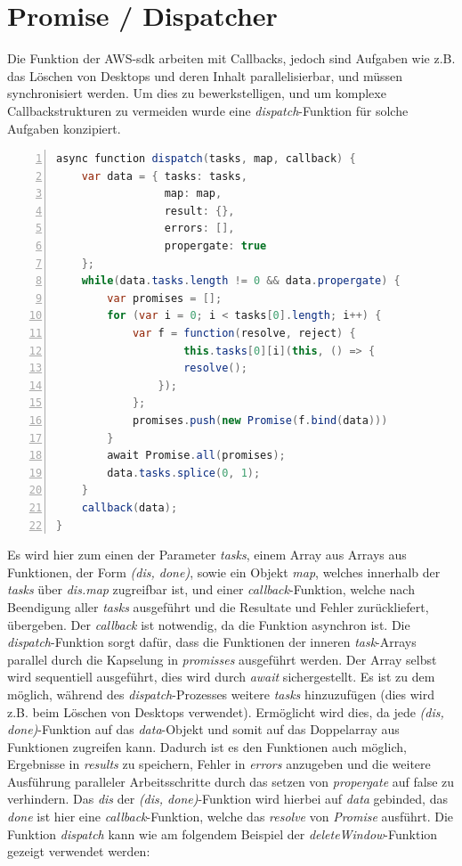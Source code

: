 \documentclass[a4paper, 12pt]{scrreprt}
\renewcommand\_{\textunderscore\allowbreak}
\begin{document}
\section{Promise / Dispatcher}

Die Funktion der AWS-sdk arbeiten mit Callbacks, jedoch sind Aufgaben wie z.B. das Löschen von Desktops und deren Inhalt parallelisierbar, und müssen synchronisiert werden. Um dies zu bewerkstelligen, und um komplexe Callbackstrukturen zu vermeiden wurde eine \textit{dispatch}-Funktion für solche Aufgaben konzipiert. 

\begin{lstlisting}[xleftmargin=\parindent,numbers=left,numberstyle=\small,numbersep=8pt,frame=L,mathescape=true, basicstyle=\small, language=Java, lineskip={1.0pt}]
async function dispatch(tasks, map, callback) {
    var data = { tasks: tasks,
                 map: map, 
                 result: {}, 
                 errors: [], 
                 propergate: true 
    };
    while(data.tasks.length != 0 && data.propergate) {
        var promises = [];
        for (var i = 0; i < tasks[0].length; i++) {
            var f = function(resolve, reject) {
                    this.tasks[0][i](this, () => {
                    resolve();
                });
            };
            promises.push(new Promise(f.bind(data)))
        }
        await Promise.all(promises);
        data.tasks.splice(0, 1);
    }
    callback(data);
}
\end{lstlisting}

Es wird hier zum einen der Parameter \textit{tasks}, einem Array aus Arrays aus Funktionen, der Form \textit{(dis, done)}, sowie ein Objekt \textit{map}, welches innerhalb der \textit{tasks} über \textit{dis.map} zugreifbar ist, und einer \textit{callback}-Funktion, welche nach Beendigung aller \textit{tasks} ausgeführt und die Resultate und Fehler zurückliefert, übergeben. Der \textit{callback} ist notwendig, da die Funktion asynchron ist. Die \textit{dispatch}-Funktion sorgt dafür, dass die Funktionen der inneren \textit{task}-Arrays parallel durch die Kapselung in \textit{promisses} ausgeführt werden. Der Array selbst wird sequentiell ausgeführt, dies wird durch \textit{await} sichergestellt. Es ist zu dem möglich, während des \textit{dispatch}-Prozesses weitere \textit{tasks} hinzuzufügen (dies wird z.B. beim Löschen von Desktops verwendet). Ermöglicht wird dies, da jede \textit{(dis, done)}-Funktion auf das \textit{data}-Objekt und somit auf das Doppelarray aus Funktionen zugreifen kann. Dadurch ist es den Funktionen auch möglich, Ergebnisse in \textit{results} zu speichern, Fehler in \textit{errors} anzugeben und die weitere Ausführung paralleler Arbeitsschritte durch das setzen von \textit{propergate} auf false zu verhindern. Das \textit{dis} der \textit{(dis, done)}-Funktion wird hierbei auf \textit{data} gebinded, das \textit{done} ist hier eine \textit{callback}-Funktion, welche das \textit{resolve} von \textit{Promise} ausführt. Die Funktion \textit{dispatch} kann wie am folgendem Beispiel der \textit{deleteWindow}-Funktion gezeigt verwendet werden:
\end{document}
